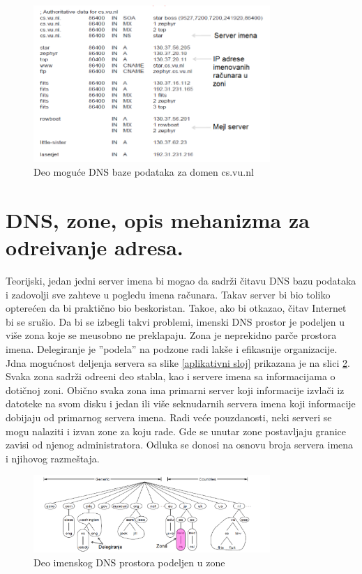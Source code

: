 \documentclass{article} %
\begin{document}
\begin{figure}[H]
	\centering
	\includegraphics[width=0.8\textwidth]{slike-aplikativniSloj/slogovi.png}
	\caption{Deo mogu\' ce DNS baze podataka za domen cs.vu.nl}\label{slogovi}
\end{figure}




%
%

\section{DNS, zone, opis mehanizma za odre\dj ivanje adresa.}

Teorijski, jedan jedni server imena bi mogao da sadr\v zi  \v citavu DNS bazu  podataka i zadovolji sve zahteve u pogledu imena ra\v cunara. Takav server bi bio toliko optere\' cen da bi prakti\v cno bio beskoristan. Tako\dj e, ako bi otkazao, \v citav Internet bi se sru\v sio. Da bi se izbegli takvi problemi, imenski DNS prostor je podeljen  u vi\v se zona koje se me\dj usobno ne preklapaju. Zona je neprekidno par\v ce prostora imena. Delegiranje je ''podela'' na podzone radi lak\v se i efikasnije organizacije. Jdna mogu\' cnost deljenja servera sa slike \ref{aplikativni sloj} prikazana je na slici \ref{zone}. Svaka zona sadr\v zi odre\dj eni deo stabla, kao i servere imena sa informacijama o doti\v cnoj zoni. Obi\v cno svaka zona ima primarni server koji informacije izvla\v ci iz datoteke na svom disku i jedan ili vi\v se seknudarnih servera imena koji informacije dobijaju od primarnog servera imena. Radi ve\' ce pouzdanosti, neki serveri se mogu nalaziti i izvan zone za koju rade. Gde se unutar zone postavljaju granice zavisi od njenog administratora. Odluka se donosi na osnovu broja servera imena  i njihovog razme\v staja. 

\begin{figure}[H]
	\centering
	\includegraphics[width=0.8\textwidth]{slike-aplikativniSloj/zone.png}
	\caption{Deo imenskog DNS prostora podeljen u zone}\label{zone}
\end{figure}
\end{document}

